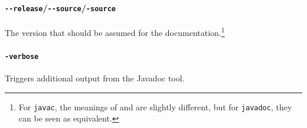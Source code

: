 \paragraph{\texttt{-{}-release}/\texttt{-{}-source}/\texttt{-source}} The \Java version that should be assumed for the documentation.\footnote{For \texttt{javac}, the meanings of \mbox{} and \mbox{} are slightly different, but for \texttt{javadoc}, they can be seen as equivalent.}

\paragraph{\texttt{-verbose}} Triggers additional output from the Javadoc tool.
 

